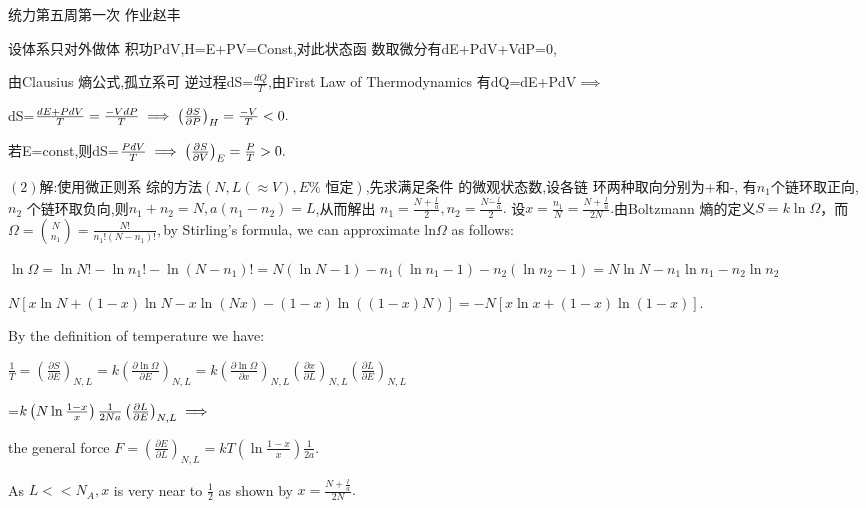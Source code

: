 \documentclass{ctexart}
\begin{document}
\bigskip 统力第五周第一次%
作业\qquad \qquad \qquad 赵丰\qquad {}


\bigskip 设体系只对外做体%
积功PdV,H=E+PV=Const,对此状态函%
数取微分有dE+PdV+VdP=0,

由Clausius 熵公式,孤立系可%
逆过程dS=$\frac{dQ}{T}$,由First Law of
Thermodynamics 有dQ=dE+PdV$\implies $

dS=$\frac{dE+PdV}{T}=\frac{-VdP}{T}\implies \left( \frac{\partial S}{%
\partial P}\right) _{H}=\frac{-V}{T}<0.$

若E=const,则dS=$\frac{PdV}{T}\implies \left( \frac{\partial S}{%
\partial V}\right) _{E}=\frac{P}{T}>0.$


$\left( 2\right) $解:使用微正则系%
综的方法$\left( N,L\left( \approx V\right) ,E\text{%
恒定}\right) $,先求满足条件%
的微观状态数,设各链%
环两种取向分别为+和-,%
有$n_{1}$个链环取正向,$n_{2}$%
个链环取负向,则$%
n_{1}+n_{2}=N,a\left( n_{1}-n_{2}\right) =L$,从而解出%
$n_{1}=\frac{N+\frac{l}{a}}{2},n_{2}=\frac{N\acute{-}\frac{l}{a}}{2}.$%
设$x=\frac{n_{1}}{N}=\frac{N+\frac{l}{a}}{2N}.$由Boltzmann%
熵的定义$S=k\ln \Omega $，而$\Omega =%
\binom{N}{n_{1}}=\frac{N!}{n_{1}!\left( N-n_{1}\right) !},$by Stirling's
formula, we can approximate ln$\Omega $ as follows:

$\ln \Omega =\ln N!-\ln n_{1}!-\ln \left( N-n_{1}\right) !=N\left( \ln
N-1\right) -n_{1}\left( \ln n_{1}-1\right) -n_{2}\left( \ln n_{2}-1\right)
=N\ln N-n_{1}\ln n_{1}-n_{2}\ln n_{2}$

$N\left[ x\ln N+\left( 1-x\right) \ln N-x\ln \left( Nx\right) -\left(
1-x\right) \ln \left( \left( 1-x\right) N\right) \right] =-N\left[ x\ln
x+\left( 1-x\right) \ln \left( 1-x\right) \right] .$

By the definition of temperature we have:

$\frac{1}{T}=\left( \frac{\partial S}{\partial E}\right) _{N,L}=k\left( 
\frac{\partial \ln \Omega }{\partial E}\right) _{N,L}=k\left( \frac{\partial
\ln \Omega }{\partial x}\right) _{N,L}\left( \frac{\partial x}{\partial L}%
\right) _{N,L}\left( \frac{\partial L}{\partial E}\right) _{N,L}$

=$k\left( N\ln \frac{1-x}{x}\right) \frac{1}{2Na}\left( \frac{\partial L}{%
\partial E}\right) _{N,L}\implies $

the general force $F=\left( \frac{\partial E}{\partial L}\right)
_{N,L}=kT\left( \ln \frac{1-x}{x}\right) \frac{1}{2a}.$

As $L<<N_{A},x$ is very near to $\frac{1}{2}$ as shown by $x=\frac{N+\frac{l%
}{a}}{2N}.$
\end{document}
